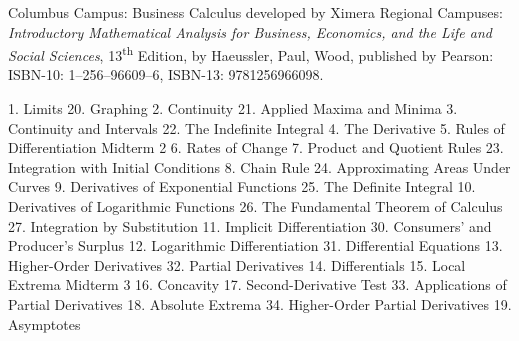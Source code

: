\documentclass{osucourse}
\begin{document}
\CatalogDescription
\PrerequisitesAndExclusions

\begin{Text}
Columbus Campus: Business Calculus developed by Ximera Regional Campuses: \emph{Introductory Mathematical Analysis for Business, Economics, and the Life and Social Sciences}, 13\textsuperscript{th} Edition, by Haeussler, Paul, Wood, published by Pearson: ISBN-10: 1--256--96609--6, ISBN-13: 9781256966098.
\end{Text}

\begin{TopicsOutline}
1. Limits                                               20. Graphing
2. Continuity                                           21. Applied Maxima and Minima
3. Continuity and Intervals                             22. The Indefinite Integral
4. The Derivative
5. Rules of Differentiation                                 Midterm 2
6. Rates of Change
7. Product and Quotient Rules                           23. Integration with Initial Conditions
8. Chain Rule                                           24. Approximating Areas Under Curves
9. Derivatives of Exponential Functions                 25. The Definite Integral
10. Derivatives of Logarithmic Functions                26. The Fundamental Theorem of Calculus 27. Integration by Substitution
11. Implicit Differentiation                            30. Consumers’ and Producer’s Surplus
12. Logarithmic Differentiation                         31. Differential Equations
13. Higher-Order Derivatives                            32. Partial Derivatives
14. Differentials
15. Local Extrema                                           Midterm 3
16. Concavity
17. Second-Derivative Test                              33. Applications of Partial Derivatives
18. Absolute Extrema                                    34. Higher-Order Partial Derivatives
19. Asymptotes
\end{TopicsOutline}
\end{document}
